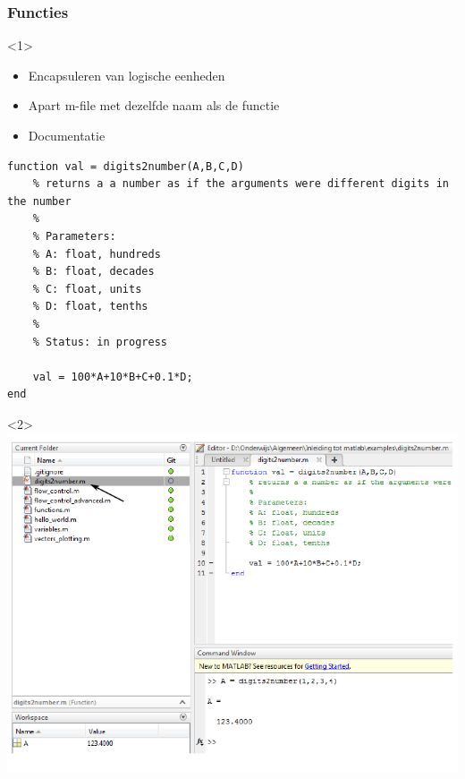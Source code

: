 \documentclass[t]{beamer}
\begin{document}
\begin{frame}[fragile]
	\frametitle{Functies}
\begin{onlyenv}<1>
	\begin{itemize}
		\item Encapsuleren van logische eenheden
		\item Apart m-file met dezelfde naam als de functie
		\item Documentatie
	\end{itemize}

	\begin{lstlisting}
function val = digits2number(A,B,C,D)
	% returns a a number as if the arguments were different digits in the number
	%
	% Parameters:
	% A: float, hundreds
	% B: float, decades
	% C: float, units
	% D: float, tenths
	%
	% Status: in progress
	
	val = 100*A+10*B+C+0.1*D;
end
	\end{lstlisting}
\end{onlyenv}
\begin{onlyenv}<2>
	\center
	\includegraphics[height=0.8\textheight]{fig/functie}
\end{onlyenv}
\end{frame}
\end{document}
